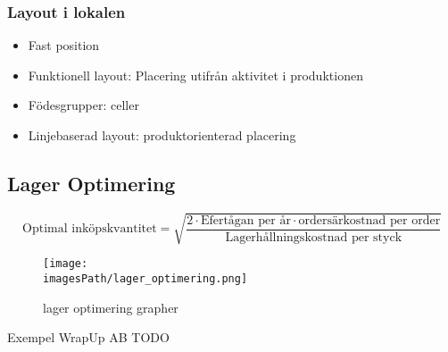 \documentclass{article}
\newcommand{\imagesPath}{images}
\begin{document}
\subsubsection{Layout i lokalen}
\begin{itemize}
    \item Fast position 
    \item Funktionell layout: Placering utifrån aktivitet i produktionen
    \item Födesgrupper: celler 
    \item Linjebaserad layout: produktorienterad placering
\end{itemize}

\subsection{Lager Optimering}
\begin{equation*}
    \text{Optimal inköpskvantitet} 
    = \sqrt{\frac{ 2\cdot\text{Efertågan per år}\cdot\text{ordersärkostnad per order} }{ \text{Lagerhållningskostnad per styck} }}
\end{equation*}

\begin{figure}[!h]
    \centering
    \texttt{[image: \\imagesPath/lager\_optimering.png]}
    \caption{lager optimering grapher}
\end{figure}

\begin{exampleblock}{Exempel WrapUp AB}
   TODO 
\end{exampleblock}
\end{document}
